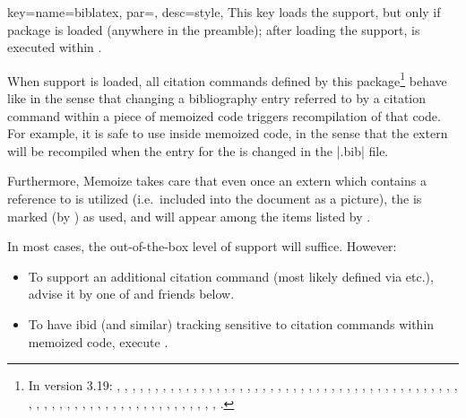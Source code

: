 \documentclass[a4paper,11pt]{article}
\begin{document}
\begin{doc}{
    key={name=biblatex, par=, desc=style},
  }
  This key loads the  support, but only if package 
  is loaded (anywhere in the preamble); after loading the support,
   is executed within .

  When  support is loaded, all citation commands defined by this
  package\footnote{ In  version 3.19: ,
    , , , ,
    , , , ,
    , , , , ,
    , , , ,
    , , , ,
    , , , ,
    , , , ,
    , , , , ,
    , , , , ,
    , , , ,
    , , , ,
    , , , ,
    , , , ,
    , , , ,
    , , , ,
    , , , ,
    , , .} behave like  in
  the sense that changing a bibliography entry referred to by a citation
  command within a piece of memoized code triggers recompilation of that code.
  For example, it is safe to use  inside memoized code, in the sense that the extern will be
  recompiled when the entry for the  is changed in the
  |.bib| file.

  Furthermore, Memoize takes care that even once an extern which contains a
  reference to  is utilized (i.e.\ included into the
  document as a picture), the  is marked (by ) as
  used, and will appear among the items listed by .

  In most cases, the out-of-the-box level of  support will
  suffice.  However:
  \begin{itemize}
  \item To support an additional citation command (most likely defined via
     etc.), advise it by one of  and
    friends below.
  \item To have ibid (and similar) tracking sensitive to citation commands
    within memoized code, execute .
  \end{itemize}


\end{doc}
\end{document}
